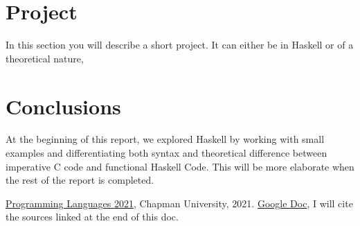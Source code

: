 \documentclass{article}
\begin{document}
\section{Project}

In this section you will describe a short project. It can either be in Haskell or of a theoretical nature,

\section{Conclusions}\label{conclusions}
At the beginning of this report, we explored Haskell by working with small examples and differentiating both syntax and theoretical difference between imperative C code and functional Haskell Code. This will be more elaborate when the rest of the report is completed.

\begin{thebibliography}{99}
 \href{https://github.com/alexhkurz/programming-languages-2021/blob/main/README.md}{Programming Languages 2021}, Chapman University, 2021.
 \href{https://docs.google.com/document/d/1e3_r3ifWnFcBaKs21iCF-OhED9x0NcDK59SA80lQjXY/edit?usp=sharing}{Google Doc}, I will cite the sources linked at the end of this doc.
\end{thebibliography}
\end{document}
